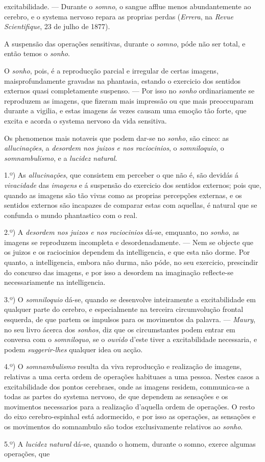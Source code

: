 excitabilidade. --- Durante o \emph{somno}, o sangue afflue menos abundantemente ao cerebro, e o systema nervoso repara as proprias perdas (\emph{Errera}, na \emph{Revue Scientifique}, 23 de julho de 1877).\par A suspensão das operações sensitivas, durante o \emph{somno}, póde não ser total, e então temos o \emph{sonho}.\par O \emph{sonho}, pois, é a reproducção parcial e irregular de certas imagens, maisprofundamente gravadas na phantasia, estando o exercicio dos sentidos externos quasi completamente suspenso. --- Por isso no \emph{sonho} ordinariamente se reproduzem as imagens, que fizeram mais impressão ou que mais preoccuparam durante a vigilia, e estas imagens ás vezes causam uma emoção tão forte, que excita e acorda o systema nervoso da vida sensitiva.\par Os phenomenos mais notaveis que podem dar-se no \emph{sonho}, são cinco: as \emph{allucinações}, a \emph{desordem nos juizos e nos raciocinios}, o \emph{somniloquio}, o \emph{somnambulismo}, e a \emph{lucidez natural}.\par 1.º) As \emph{allucinações}, que consistem em perceber o que não é, são devidás á \emph{vivacidade} das \emph{imagens} e á suspensão do exercicio dos sentidos externos; pois que, quando as imagens são tão vivas como as proprias percepções externas, e os sentidos externos são incapazes de comparar estas com aquellas, é natural que se confunda o mundo phantastico com o real.\par 2.º) A \emph{desordem nos juizos e nos raciocinios} dá-se, emquanto, no \emph{sonho}, as imagens se reproduzem incompleta e desordenadamente. --- Nem se objecte que os juizos e os raciocinios dependem da intelligencia, e que esta não dorme. Por quanto, a intelligencia, embora não durma, não póde, no seu exercicio, prescindir do concurso das imagens, e por isso a desordem na imaginação reflecte-se necessariamente na intelligencia.\par 3.º) O \emph{somniloquio} dá-se, quando se desenvolve inteiramente a excitabilidade em qualquer parte do cerebro, e especialmente na terceira circumvolução frontal esquerda, de que partem os impulsos para os movimentos da palavra. --- \emph{Maury}, no seu livro ácerca dos \emph{sonhos}, diz que os circumstantes podem entrar em conversa com o \emph{somniloquo}, se o \emph{ouvido} d'este tiver a excitabilidade necessaria, e podem \emph{suggerir-lhes} qualquer idea ou acção.\par 4.º) O \emph{somnambulismo} resulta da viva reproducção e realização de imagens, relativas a uma certa ordem de operações habituaes a uma pessoa. Nestes casos a excitabilidade dos pontos cerebraes, onde as imagens residem, communica-se a todas as partes do systema nervoso, de que dependem as sensações e os movimentos necessarios para a realização d'aquella ordem de operações. O resto do eixo cerebro-espinhal está adormecido, e por isso as operações, as sensações e os movimentos do somnambulo são todos exclusivamente relativos ao \emph{sonho}.\par 5.º) A \emph{lucidez natural} dá-se, quando o homem, durante o somno, exerce algumas operações, que 